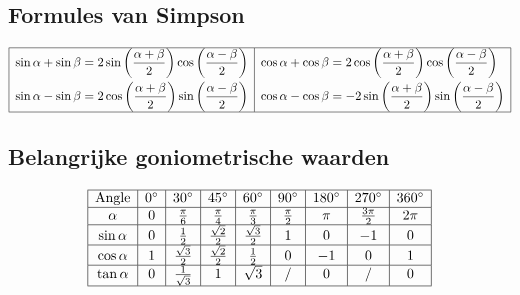 \documentclass[a5paper]{article}
\begin{document}
\subsection{Formules van Simpson}
$
\begin{array}{|c|c|}
\hline
\begin{aligned}
\sin \alpha + \sin \beta &= 2\sin\left(\frac{\alpha + \beta}{2}\right)\cos\left(\frac{\alpha - \beta}{2}\right) \\
\sin \alpha - \sin \beta &= 2\cos\left(\frac{\alpha + \beta}{2}\right)\sin\left(\frac{\alpha - \beta}{2}\right)
\end{aligned} & 
\begin{aligned}
\cos \alpha + \cos \beta &= 2\cos\left(\frac{\alpha + \beta}{2}\right)\cos\left(\frac{\alpha - \beta}{2}\right) \\
\cos \alpha - \cos \beta &= -2\sin\left(\frac{\alpha + \beta}{2}\right)\sin\left(\frac{\alpha - \beta}{2}\right)
\end{aligned} \\
\hline
\end{array}
$

\newpage
\subsection{Belangrijke goniometrische waarden}
\[
\begin{array}{|c|c|c|c|c|c|c|c|c|c|}
\hline
\text{Angle} & 0^\circ & 30^\circ & 45^\circ & 60^\circ & 90^\circ & 180^\circ & 270^\circ & 360^\circ \\
\hline
\alpha & 0 & \frac{\pi}{6} & \frac{\pi}{4} & \frac{\pi}{3} & \frac{\pi}{2} & \pi & \frac{3\pi}{2} & 2\pi \\
\hline
\sin \alpha & 0 & \frac{1}{2} & \frac{\sqrt{2}}{2} & \frac{\sqrt{3}}{2} & 1 & 0 & -1 & 0 \\
\hline
\cos \alpha & 1 & \frac{\sqrt{3}}{2} & \frac{\sqrt{2}}{2} & \frac{1}{2} & 0 & -1 & 0 & 1 \\
\hline
\tan \alpha & 0 & \frac{1}{\sqrt{3}} & 1 & \sqrt{3} & / & 0 & / & 0 \\
\hline
\end{array}
\]
\end{document}
